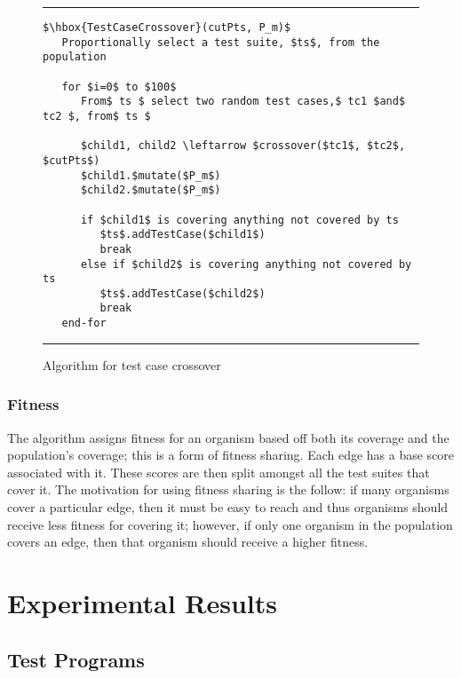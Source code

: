 \documentclass[runningheads]{llncs}
\begin{document}
\begin{figure}[h!]
\begin{center}
\hrule
\medskip
\begin{Verbatim}[fontfamily=tt, xleftmargin=10pt, commandchars=\\\{\},
        codes={\catcode`$=3\catcode`^=7\catcode`_=8}]
$\hbox{TestCaseCrossover}(cutPts, P_m)$  
   Proportionally select a test suite, $ts$, from the population
   
   for $i=0$ to $100$
      From$ ts $ select two random test cases,$ tc1 $and$ tc2 $, from$ ts $
      
      $child1, child2 \leftarrow $crossover($tc1$, $tc2$, $cutPts$)
      $child1.$mutate($P_m$)
      $child2.$mutate($P_m$)
      
      if $child1$ is covering anything not covered by ts
         $ts$.addTestCase($child1$)
         break
      else if $child2$ is covering anything not covered by ts
         $ts$.addTestCase($child2$)
         break
   end-for
\end{Verbatim}
\hrule
\end{center}
\caption{Algorithm for test case crossover \label{fig:tcCross}}
\end{figure}

\FloatBarrier
\subsubsection{Fitness}
The algorithm assigns fitness for an organism based off both its coverage and the population's coverage; this is a form of fitness sharing. Each edge has a base score associated with it. These scores are then split amongst all the test suites that cover it. The motivation for using fitness sharing is the follow: if many organisms cover a particular edge, then it must be easy to reach and thus organisms should receive less fitness for covering it; however, if only one organism in the population covers an edge, then that organism should receive a higher fitness.

\FloatBarrier
\newpage
\section{Experimental Results}
\subsection{Test Programs}



\newpage
\end{document}
